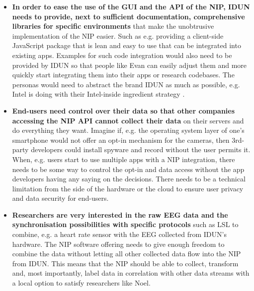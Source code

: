 \begin{itemize}
  \item \textbf{In order to ease the use of the GUI and the API of the NIP, IDUN needs to provide, next to sufficient documentation, comprehensive libraries for specific environments} that make the unobtrusive implementation of the NIP easier. Such as e.g. providing a client-side JavaScript package that is lean and easy to use that can be integrated into existing apps. Examples for such code integration would also need to be provided by IDUN so that people like Evan can easily adjust them and more quickly start integrating them into their apps or research codebases. The personas would need to abstract the brand IDUN as much as possible, e.g. Intel is doing with their Intel-inside ingredient strategy \citep{intel_ingredient_nodate}.
  \item \textbf{End-users need control over their data so that other companies accessing the NIP API cannot collect their data} on their servers and do everything they want. Imagine if, e.g. the operating system layer of one's smartphone would not offer an opt-in mechanism for the cameras, then 3rd-party developers could install spyware and record without the user permits it. When, e.g. users start to use multiple apps with a NIP integration, there needs to be some way to control the opt-in and data access without the app developers having any saying on the decisions. There needs to be a technical limitation from the side of the hardware or the cloud to ensure user privacy and data security for end-users.
  \item \textbf{Researchers are very interested in the raw EEG data and the synchronisation possibilities with specific protocols} such as LSL to combine, e.g. a heart rate sensor with the EEG collected from IDUN's hardware. The NIP software offering needs to give enough freedom to combine the data without letting all other collected data flow into the NIP from IDUN. This means that the NIP should be able to collect, transform and, most importantly, label data in correlation with other data streams with a local option to satisfy researchers like Noel.
\end{itemize}

